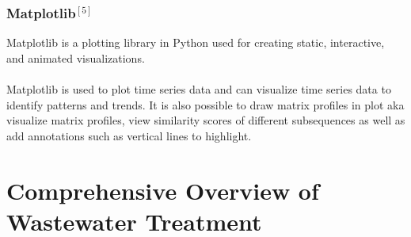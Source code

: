 \documentclass[]{iat}
\begin{document}
\subsection{Matplotlib$^{[5]}$}
Matplotlib is a plotting library in Python used for creating static, interactive, and animated visualizations.\\
\\
Matplotlib is used to plot time series data and can visualize time series data to identify patterns and trends. It is also possible to draw matrix profiles in plot aka visualize matrix profiles, view similarity scores of different subsequences as well as add annotations such as vertical lines to highlight.
\chapter{Comprehensive Overview of Wastewater Treatment}
\end{document}
